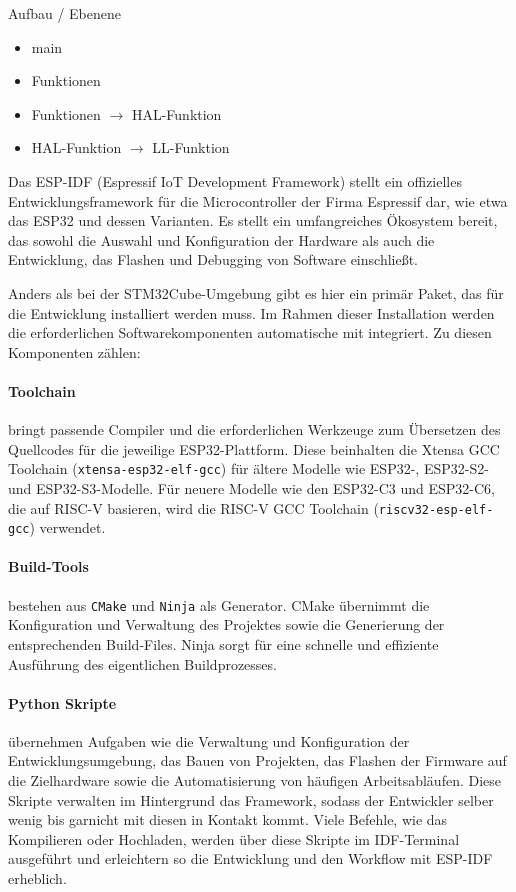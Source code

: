 Aufbau / Ebenene
\begin{itemize}
	\item main
	\item Funktionen
	\item Funktionen $\rightarrow$ HAL-Funktion
	\item HAL-Funktion $\rightarrow$ LL-Funktion
\end{itemize}

Das ESP-IDF (Espressif IoT Development Framework) stellt ein offizielles Entwicklungsframework für die Microcontroller der Firma Espressif dar, wie etwa das ESP32 und dessen Varianten. 
Es stellt ein umfangreiches Ökosystem bereit, das sowohl die Auswahl und Konfiguration der Hardware als auch die Entwicklung, das Flashen und Debugging von Software einschließt.

Anders als bei der STM32Cube-Umgebung gibt es hier ein primär Paket, das für die Entwicklung installiert werden muss.
Im Rahmen dieser Installation werden die erforderlichen Softwarekomponenten automatische mit integriert.
Zu diesen Komponenten zählen:

\paragraph{Toolchain}
bringt passende Compiler und die erforderlichen Werkzeuge zum Übersetzen des Quellcodes für die jeweilige ESP32-Plattform. 
Diese beinhalten die Xtensa GCC Toolchain (\texttt{xtensa-esp32-elf-gcc}) für ältere Modelle wie  ESP32-, ESP32-S2- und ESP32-S3-Modelle.
Für neuere Modelle wie den ESP32-C3 und ESP32-C6, die auf RISC-V basieren, wird die RISC-V GCC Toolchain (\texttt{riscv32-esp-elf-gcc}) verwendet.

\paragraph{Build-Tools} 
bestehen aus \texttt{CMake} und \texttt{Ninja} als Generator. 
CMake übernimmt die Konfiguration und Verwaltung des Projektes sowie die Generierung der entsprechenden Build-Files. 
Ninja sorgt für eine schnelle und effiziente Ausführung des eigentlichen Buildprozesses.

\paragraph{Python Skripte}
übernehmen Aufgaben wie die Verwaltung und Konfiguration der Entwicklungsumgebung, das Bauen von Projekten, das Flashen der Firmware auf die Zielhardware sowie die Automatisierung von häufigen Arbeitsabläufen. 
Diese Skripte verwalten im Hintergrund das Framework, sodass der Entwickler selber wenig bis garnicht mit diesen in Kontakt kommt.
Viele Befehle, wie das Kompilieren oder Hochladen, werden über diese Skripte im IDF-Terminal ausgeführt und erleichtern so die Entwicklung und den Workflow mit ESP-IDF erheblich.

